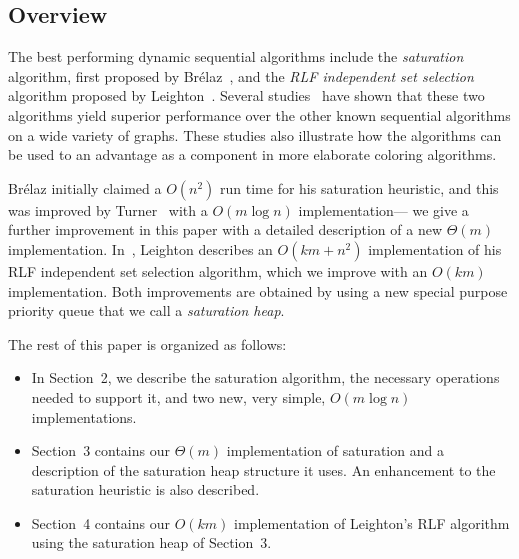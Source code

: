 \subsection{Overview}
The best performing dynamic sequential algorithms include 
the {\em saturation\/} 
algorithm, first proposed by Br\'{e}laz~\cite{BRE1979}, and the {\em RLF
independent set selection\/} algorithm proposed by Leighton~\cite{LEI1979}.
Several studies~\cite{JOH1990,KUB1985,LEI1979,MOR1991,MOR1990,TUR1988}
have shown that these two algorithms yield superior 
performance over the other known sequential algorithms on a wide variety
of graphs.  These studies also illustrate how the algorithms can be used 
to an advantage as a component in more elaborate coloring algorithms.

Br\'{e}laz initially claimed a $O(n^2)$ run time for his saturation heuristic, 
and this was improved by Turner~\cite{TUR1988}
with a $O(m \log n)$ implementation---
we give a further improvement in this paper with a detailed description of a 
new $\Theta(m)$ implementation.  
In~\cite{LEI1979}, Leighton describes an $O(km + n^2)$ implementation of his
RLF independent set selection algorithm, which we improve with an $O(km)$
implementation.  Both improvements are obtained by using a new special purpose
priority queue that we call a {\em saturation heap}.

The rest of this paper is organized as follows: 
\begin{itemize}
\item In Section~2, we describe the saturation algorithm, the
necessary operations needed to support it, and two new, very simple,
$O(m \log n)$ implementations.
\item Section~3 contains our $\Theta(m)$ implementation of saturation 
and a description of the saturation heap structure it uses.  An enhancement 
to the saturation heuristic is also described.
\item Section~4 contains our $O(km)$ implementation of Leighton's RLF
algorithm using the saturation heap of Section~3.
\end{itemize}
 

